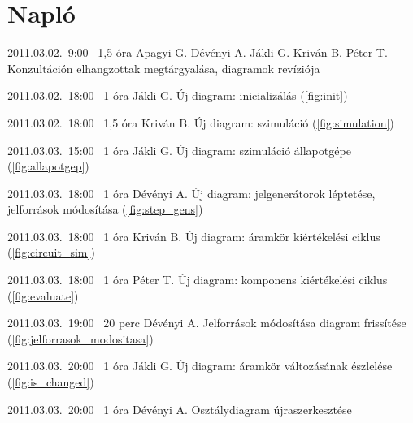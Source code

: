 %
\section{Napló}

\begin{naplo}

\bejegyzes
{2011.03.02.~9:00~} %
{1,5 óra} %
{Apagyi G.\newline
Dévényi A.\newline
Jákli G.\newline
Kriván B.\newline
Péter T.} %
{Konzultáción elhangzottak megtárgyalása, diagramok revíziója} %

\bejegyzes
{2011.03.02.~18:00~} %
{1 óra} %
{Jákli G.} %
{Új diagram: inicializálás (\ref{fig:init})} %

\bejegyzes
{2011.03.02.~18:00~} %
{1,5 óra} %
{Kriván B.} %
{Új diagram: szimuláció (\ref{fig:simulation})} %

\bejegyzes
{2011.03.03.~15:00~} %
{1 óra} %
{Jákli G.} %
{Új diagram: szimuláció állapotgépe (\ref{fig:allapotgep})} %

\bejegyzes
{2011.03.03.~18:00~} %
{1 óra} %
{Dévényi A.} %
{Új diagram: jelgenerátorok léptetése, jelforrások módosítása (\ref{fig:step_gens})} %

\bejegyzes
{2011.03.03.~18:00~} %
{1 óra} %
{Kriván B.} %
{Új diagram: áramkör kiértékelési ciklus (\ref{fig:circuit_sim})} %

\bejegyzes
{2011.03.03.~18:00~} %
{1 óra} %
{Péter T.} %
{Új diagram: komponens kiértékelési ciklus (\ref{fig:evaluate})} %

\bejegyzes
{2011.03.03.~19:00~} %
{20 perc} %
{Dévényi A.} %
{Jelforrások módosítása diagram frissítése (\ref{fig:jelforrasok_modositasa})} %

\bejegyzes
{2011.03.03.~20:00~} %
{1 óra} %
{Jákli G.} %
{Új diagram: áramkör változásának észlelése (\ref{fig:is_changed})} %

\bejegyzes
{2011.03.03.~20:00~} %
{1 óra} %
{Dévényi A.} %
{Osztálydiagram újraszerkesztése} %


\end{naplo}
